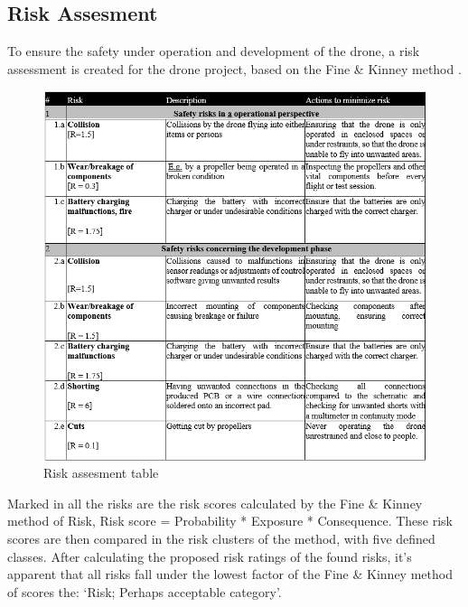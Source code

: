 \subsection{Risk Assesment}

To ensure the safety under operation and development of the drone, a risk assessment is created for the drone project, based on the Fine \& Kinney method \cite{finekinney}.

\begin{figure}[H]
    \begin{center}
    \includegraphics[scale=0.7]{pictures/Risk assesment table.png}
    \end{center}
    \caption{Risk assesment table}
    \label{Risk assesment table}
\end{figure}

Marked in all the risks are the risk scores calculated by the Fine \& Kinney method of Risk, Risk score = Probability * Exposure * Consequence. These risk scores are then compared in the risk clusters of the method, with five defined classes. After calculating the proposed risk ratings of the found risks, it’s apparent that all risks fall under the lowest factor of the Fine \& Kinney method of scores the: ‘Risk; Perhaps acceptable category’. 
